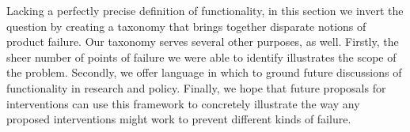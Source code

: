 \documentclass[acmconf,manuscript,screen,natbib=true]{acmart}
\begin{document}




Lacking a perfectly precise definition of functionality, in this section we invert the question by creating a taxonomy that brings together disparate notions of product failure. %
Our taxonomy serves several other purposes, as well. Firstly, the sheer number of points of failure we were able to identify illustrates the scope of the problem. Secondly, we offer language in which to ground future discussions of functionality in research and policy. Finally, we hope that future proposals for interventions can use this framework to concretely illustrate the way any proposed interventions might work to prevent different kinds of failure. 
\end{document}
